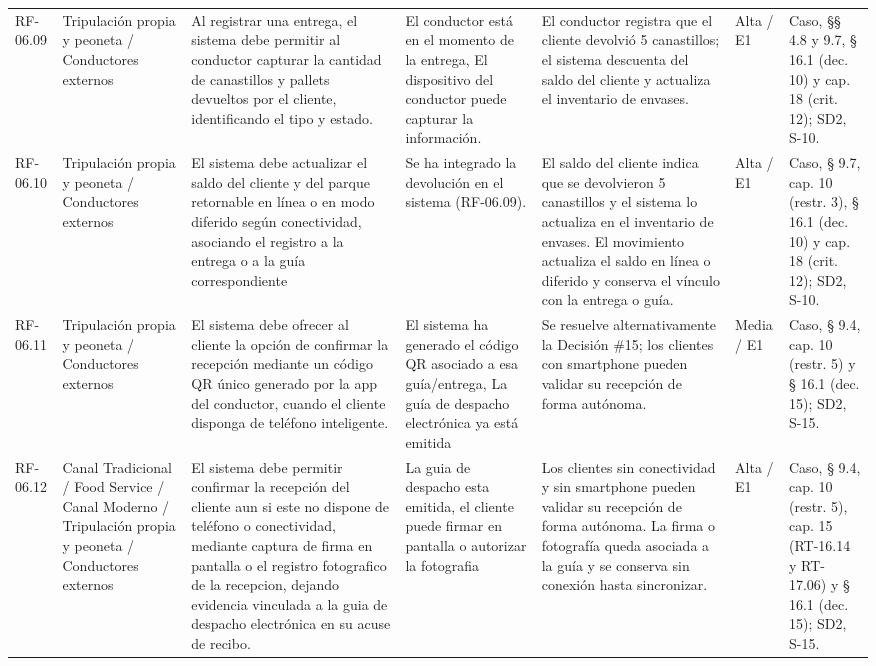 {\begin{longtable}{@{}F{0.062} F{0.080} F{0.195} F{0.160} F{0.240} F{0.093} F{0.170}@{}}
  RF-06.09 & Tripulación propia y peoneta / Conductores externos & Al registrar una entrega, el sistema debe permitir al conductor capturar la cantidad de canastillos y pallets devueltos por el cliente, identificando el tipo y estado. & El conductor está en el momento de la entrega, El dispositivo del conductor puede capturar la información. & El conductor registra que el cliente devolvió 5 canastillos; el sistema descuenta del saldo del cliente y actualiza el inventario de envases. & Alta / E1 & Caso, §§ 4.8 y 9.7, § 16.1 (dec. 10) y cap. 18 (crit. 12); SD2, S-10. \\
  RF-06.10 & Tripulación propia y peoneta / Conductores externos & El sistema debe actualizar el saldo del cliente y del parque retornable en línea o en modo diferido según conectividad, asociando el registro a la entrega o a la guía correspondiente & Se ha integrado la devolución en el sistema (RF-06.09). & El saldo del cliente indica que se devolvieron 5 canastillos y el sistema lo actualiza en el inventario de envases. El movimiento actualiza el saldo en línea o diferido y conserva el vínculo con la entrega o guía. & Alta / E1 & Caso, § 9.7, cap. 10 (restr. 3), § 16.1 (dec. 10) y cap. 18 (crit. 12); SD2, S-10. \\
  RF-06.11 & Tripulación propia y peoneta / Conductores externos & El sistema debe ofrecer al cliente la opción de confirmar la recepción mediante un código QR único generado por la app del conductor, cuando el cliente disponga de teléfono inteligente. & El sistema ha generado el código QR asociado a esa guía/entrega, La guía de despacho electrónica ya está emitida & Se resuelve alternativamente la Decisión \#15; los clientes con smartphone pueden validar su recepción de forma autónoma. & Media / E1 & Caso, § 9.4, cap. 10 (restr. 5) y § 16.1 (dec. 15); SD2, S-15. \\
  RF-06.12 & Canal Tradicional / Food Service / Canal Moderno / Tripulación propia y peoneta / Conductores externos & El sistema debe permitir confirmar la recepción del cliente aun si este no dispone de teléfono o conectividad, mediante captura de firma en pantalla o el registro fotografico de la recepcion, dejando evidencia vinculada a la guia de despacho electrónica en su acuse de recibo. & La guia de despacho esta emitida, el cliente puede firmar en pantalla o autorizar la fotografia & Los clientes sin conectividad y sin smartphone pueden validar su recepción de forma autónoma. La firma o fotografía queda asociada a la guía y se conserva sin conexión hasta sincronizar. & Alta / E1 & Caso, § 9.4, cap. 10 (restr. 5), cap. 15 (RT-16.14 y RT-17.06) y § 16.1 (dec. 15); SD2, S-15. \\

\end{longtable}}
